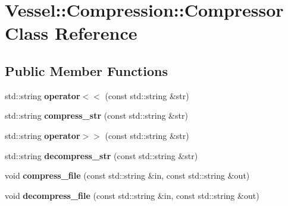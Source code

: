 \hypertarget{class_vessel_1_1_compression_1_1_compressor}{}\section{Vessel\+:\+:Compression\+:\+:Compressor Class Reference}
\label{class_vessel_1_1_compression_1_1_compressor}
\subsection*{Public Member Functions}
\begin{DoxyCompactItemize}
\item 
\mbox{\label{class_vessel_1_1_compression_1_1_compressor_a7e1c002de3270a409ff7eb01d7bf02ab}} 
std\+::string {\bfseries operator$<$$<$} (const std\+::string \&str)
\item 
\mbox{\label{class_vessel_1_1_compression_1_1_compressor_ac139ea29ab9179dbc13db747126da4c2}} 
std\+::string {\bfseries compress\+\_\+str} (const std\+::string \&str)
\item 
\mbox{\label{class_vessel_1_1_compression_1_1_compressor_a5189949b6fc15d12e9060b70e3f7d7ca}} 
std\+::string {\bfseries operator$>$$>$} (const std\+::string \&str)
\item 
\mbox{\label{class_vessel_1_1_compression_1_1_compressor_a4685597c6541cfce47e0429733ce58f0}} 
std\+::string {\bfseries decompress\+\_\+str} (const std\+::string \&str)
\item 
\mbox{\label{class_vessel_1_1_compression_1_1_compressor_a35d0020a45b507305c28cee1a4394243}} 
void {\bfseries compress\+\_\+file} (const std\+::string \&in, const std\+::string \&out)
\item 
\mbox{\label{class_vessel_1_1_compression_1_1_compressor_a7e5def9b235292478308526a9aa81824}} 
void {\bfseries decompress\+\_\+file} (const std\+::string \&in, const std\+::string \&out)
\item 
\mbox{\label{class_vessel_1_1_compression_1_1_compressor_a8602e908023627b491552a7c3f5642cc}} 

\end{DoxyCompactItemize}
